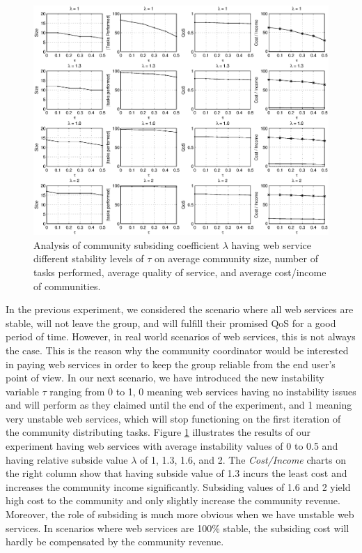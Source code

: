 \documentclass[10pt,journal,cspaper,compsoc]{IEEEtran}
\begin{document}
\begin{figure}%
\centerline{\includegraphics[width=6.8in]{tax_dyn.eps}}
\caption{Analysis of community subsiding coefficient $\lambda$
having web service different stability levels of $\tau$ on average
community size, number of tasks performed, average quality of
service, and average cost/income of communities.}
\label{fig_dynamic_taxtation}
\end{figure}


In the previous experiment, we considered the scenario where all
web services are stable, will not leave the group, and will
fulfill their promised QoS for a good period of time. However, in
real world scenarios of web services, this is not always the case.
This is the reason why the community coordinator would be interested in paying
web services in order to keep the group reliable from the end
user's point of view. In our next scenario, we have introduced the
new instability variable $\tau$ ranging from 0 to 1, 0 meaning web
services having no instability issues and will perform as they
claimed until the end of the experiment, and 1 meaning very
unstable web services, which will stop functioning on the first
iteration of the community distributing tasks. Figure
\ref{fig_dynamic_taxtation} illustrates the results of our
experiment having web services with average instability values of
0 to 0.5 and having relative subside value $\lambda$ of 1, 1.3,
1.6, and 2. The \emph{Cost/Income} charts on the right column show
that having subside value of 1.3 incurs the least cost and
increases the community income significantly. Subsiding values of
1.6 and 2 yield high cost to the community and only slightly
increase the community revenue. Moreover, the role of subsiding is
much more obvious when we have unstable web services. In scenarios
where web services are 100\% stable, the subsiding cost will
hardly be compensated by the community revenue.
\end{document}
